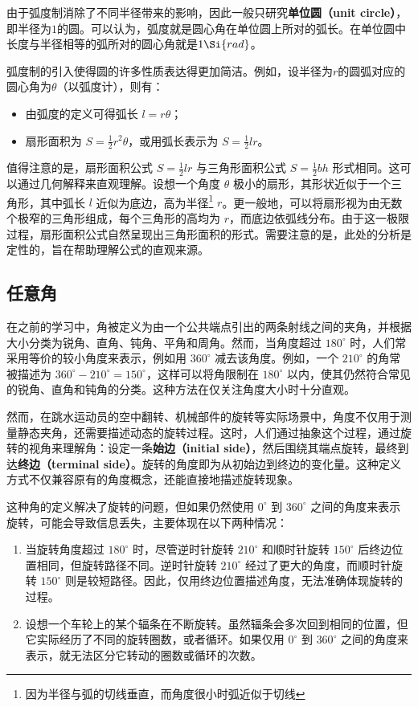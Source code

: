 由于弧度制消除了不同半径带来的影响，因此一般只研究\textbf{单位圆（unit circle）}，即半径为$1$的圆。可以认为，弧度就是圆心角在单位圆上所对的弧长。在单位圆中长度与半径相等的弧所对的圆心角就是$1 \Si{rad}$。

弧度制的引入使得圆的许多性质表达得更加简洁。例如，设半径为$r$的圆弧对应的圆心角为$\theta$（以弧度计），则有：
\begin{itemize}
\item 由弧度的定义可得弧长 $l = r\theta$；
\item 扇形面积为 $\displaystyle S = \frac{1}{2} r^2 \theta$，或用弧长表示为 $\displaystyle S = \frac{1}{2} l r$。
\end{itemize}

值得注意的是，扇形面积公式 $\displaystyle S = \frac{1}{2} l r$ 与三角形面积公式 $\displaystyle S = \frac{1}{2} bh$ 形式相同。这可以通过几何解释来直观理解。设想一个角度 $\theta$ 极小的扇形，其形状近似于一个三角形，其中弧长 $l$ 近似为底边，高为半径\footnote{因为半径与弧的切线垂直，而角度很小时弧近似于切线} $r$。更一般地，可以将扇形视为由无数个极窄的三角形组成，每个三角形的高均为 $r$，而底边依弧线分布。由于这一极限过程，扇形面积公式自然呈现出三角形面积的形式。需要注意的是，此处的分析是定性的，旨在帮助理解公式的直观来源。


\subsection{任意角}

在之前的学习中，角被定义为由一个公共端点引出的两条射线之间的夹角，并根据大小分类为锐角、直角、钝角、平角和周角。然而，当角度超过 $180^\circ$ 时，人们常采用等价的较小角度来表示，例如用 $360^\circ$ 减去该角度。例如，一个 $210^\circ$ 的角常被描述为 $360^\circ - 210^\circ = 150^\circ$，这样可以将角限制在 $180^\circ$ 以内，使其仍然符合常见的锐角、直角和钝角的分类。这种方法在仅关注角度大小时十分直观。

然而，在跳水运动员的空中翻转、机械部件的旋转等实际场景中，角度不仅用于测量静态夹角，还需要描述动态的旋转过程。这时，人们通过抽象这个过程，通过旋转的视角来理解角：设定一条\textbf{始边（initial side）}，然后围绕其端点旋转，最终到达\textbf{终边（terminal side）}。旋转的角度即为从初始边到终边的变化量。这种定义方式不仅兼容原有的角度概念，还能直接地描述旋转现象。

这种角的定义解决了旋转的问题，但如果仍然使用 $0^\circ$ 到 $360^\circ$ 之间的角度来表示旋转，可能会导致信息丢失，主要体现在以下两种情况：
\begin{enumerate}
\item 当旋转角度超过 $180^\circ$ 时，尽管逆时针旋转 $210^\circ$ 和顺时针旋转 $150^\circ$ 后终边位置相同，但旋转路径不同。逆时针旋转 $210^\circ$ 经过了更大的角度，而顺时针旋转 $150^\circ$ 则是较短路径。因此，仅用终边位置描述角度，无法准确体现旋转的过程。
\item 设想一个车轮上的某个辐条在不断旋转。虽然辐条会多次回到相同的位置，但它实际经历了不同的旋转圈数，或者循环。如果仅用 $0^\circ$ 到 $360^\circ$ 之间的角度来表示，就无法区分它转动的圈数或循环的次数。
\end{enumerate}

